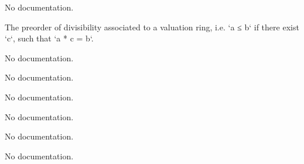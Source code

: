 \begin{definition}\label{CompleteDiscreteValuedField}
        \leanok
                No documentation.
    \end{definition}

\begin{definition}\label{ValuationRingTopology.ValuationRing.setoid}
                The preorder of divisibility associated to a valuation ring, i.e. `a ≤ b` if there exist `c`, such that `a * c = b`.
    \end{definition}

\begin{definition}\label{ValuationRingTopology.ValuationRing.ValueMonoid}
                No documentation.
    \end{definition}

\begin{definition}\label{ValuationRingTopology.Valuation.leIdeal}
                No documentation.
    \end{definition}

\begin{definition}\label{ValuationRingTopology.Valuation.ltIdeal}
                No documentation.
    \end{definition}

\begin{definition}\label{ValuationRingTopology.Valuation.maximalIdeal}
                No documentation.
    \end{definition}

\begin{theorem}\label{Valued.le_iff_val_le}
                No documentation.
    \end{theorem}

\begin{theorem}\label{Valued.lt_iff_val_lt}
                No documentation.
    \end{theorem}

